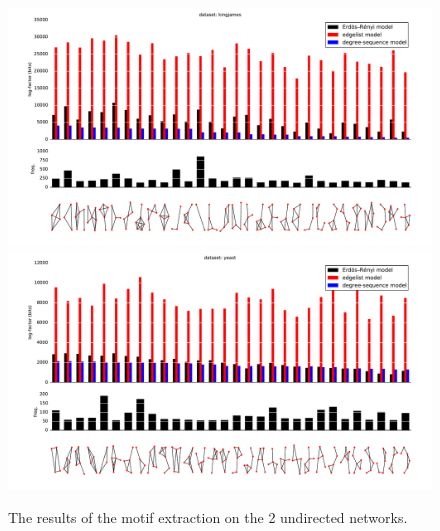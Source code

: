 \begin{figure}[p]
  \includegraphics[width=\textwidth]{./images/kingjames/compare-plot.pdf}\\
  \includegraphics[width=\textwidth]{./images/yeast/compare-plot.pdf}\\
  \caption{The results of the motif extraction on the 2 undirected networks.}
  \label{figure:plot-und}
\end{figure}
  
